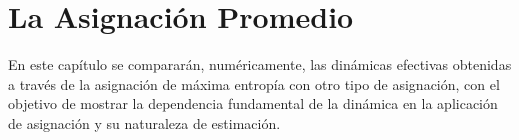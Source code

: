 \chapter{La Asignación Promedio}

En este capítulo se compararán, numéricamente, las dinámicas efectivas obtenidas a través de la asignación de máxima entropía con otro tipo de asignación, con el objetivo de mostrar la dependencia fundamental de la dinámica en la aplicación de asignación y su naturaleza de estimación.




\newpage